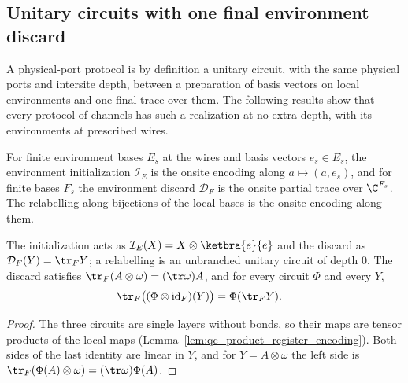 \subsection{Unitary circuits with one final environment discard}

A physical-port protocol is by definition a unitary circuit, with the same
physical ports and intersite depth, between a preparation of basis vectors on
local environments and one final trace over them. The following results show
that every protocol of channels has such a realization at no extra depth, with
its environments at prescribed wires.

\begin{definition}
    \label{def:qc_appended_environment}
    \leanok
    For finite environment bases $E_s$ at the wires and basis vectors $e_s\in E_s$, the
    environment initialization $\mathcal I_E$ is the onsite encoding along $a\mapsto(a,e_s)$, and
    for finite bases $F_s$ the environment discard $\mathcal D_F$ is the onsite partial trace over
    $\C^{F_s}$. The relabelling along bijections of the local bases is the onsite encoding along
    them.
\end{definition}

\begin{lemma}
    \label{thm:qc_appended_environment_operators}
    \leanok
    The initialization acts as $\mathcal I_E(X)=X\otimes\ketbra{e}{e}$ and the discard as
    $\mathcal D_F(Y)=\tr_FY$; a relabelling is an unbranched unitary circuit of depth $0$. The
    discard satisfies $\tr_F(A\otimes\omega)=(\tr\omega)A$, and for every circuit $\Phi$ and
    every $Y$,
    \begin{align}
        \tr_F\bigl((\Phi\otimes\operatorname{id}_F)(Y)\bigr) & =\Phi(\tr_FY).\notag
    \end{align}
\end{lemma}
\begin{proof}\leanok
    The three circuits are single layers without bonds, so their maps are tensor products of
    the local maps (Lemma~\ref{lem:qc_product_register_encoding}). Both sides of the last
    identity are linear in $Y$, and for $Y=A\otimes\omega$ the left side is
    $\tr_F(\Phi(A)\otimes\omega)=(\tr\omega)\Phi(A)$.
\end{proof}

